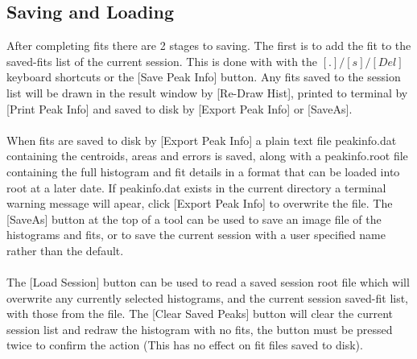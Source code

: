 \documentclass[a4paper,10pt]{article}
\begin{document}
\subsection{Saving and Loading}
After completing fits there are 2 stages to saving. The first is to add the fit to the saved-fits list of the current session.
This is done with with the $[.]/[s]/[Del]$ keyboard shortcuts or the [Save Peak Info] button.
Any fits saved to the session list will be drawn in the result window by [Re-Draw Hist], printed to terminal by [Print Peak Info] and saved to disk by [Export Peak Info] or [SaveAs].  
\\
\\
When fits are saved to disk by [Export Peak Info] a plain text file peakinfo.dat containing the centroids, areas and errors is saved, along with a peakinfo.root file containing the full histogram and fit details in a format that can be loaded into root at a later date.
If peakinfo.dat exists in the current directory a terminal warning message will apear, click [Export Peak Info] to overwrite the file.
The [SaveAs] button at the top of a tool can be used to save an image file of the histograms and fits, or to save the current session with a user specified name rather than the default.
\\
\\
The [Load Session] button can be used to read a saved session root file which will overwrite any currently selected histograms, and the current session saved-fit list, with those from the file.
The [Clear Saved Peaks] button will clear the current session list and redraw the histogram with no fits, the button must be pressed twice to confirm the action (This has no effect on fit files saved to disk).
\end{document}
